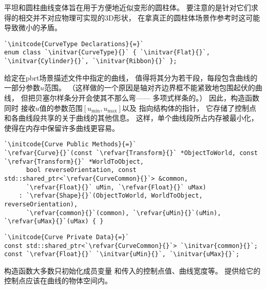 平坦和圆柱曲线变体旨在用于方便地近似变形的圆柱体。
要注意的是针对它们求得的相交并不对应物理可实现的3D形状，
在拿真正的圆柱体场景作参考时这可能导致微小的矛盾。
\begin{lstlisting}
`\initcode{CurveType Declarations}{=}`
enum class `\initvar{CurveType}{}` { `\initvar{Flat}{}`, `\initvar{Cylinder}{}`, `\initvar{Ribbon}{}` };
\end{lstlisting}

给定在pbrt场景描述文件中指定的曲线，
值得将其分为若干段，每段包含曲线的一部分参数$u$范围。
（这样做的一个原因是轴对齐边界框不能紧致地包围起伏的曲线，
但把贝塞尔样条分开会使其不那么弯——
多项式样条的。）
因此，构造函数同时
接收$u$值的参数范围$[u_{\min},u_{\max}]$以及
指向结构体的指针，
它存储了控制点和各曲线段共享的关于曲线的其他信息。
这样，单个曲线段所占内存被最小化，
使得在内存中保留许多曲线更容易。
\begin{lstlisting}
`\initcode{Curve Public Methods}{=}`
`\refvar{Curve}{}`(const `\refvar{Transform}{}` *ObjectToWorld, const `\refvar{Transform}{}` *WorldToObject,
      bool reverseOrientation, const std::shared_ptr<`\refvar{CurveCommon}{}`> &common,
      `\refvar{Float}{}` uMin, `\refvar{Float}{}` uMax)
    : `\refvar{Shape}{}`(ObjectToWorld, WorldToObject, reverseOrientation),
      `\refvar{common}{}`(common), `\refvar{uMin}{}`(uMin), `\refvar{uMax}{}`(uMax) { }
\end{lstlisting}
\begin{lstlisting}
`\initcode{Curve Private Data}{=}`
const std::shared_ptr<`\refvar{CurveCommon}{}`> `\initvar{common}{}`;
const `\refvar{Float}{}` `\initvar{uMin}{}`, `\initvar{uMax}{}`; 
\end{lstlisting}

构造函数大多数只初始化成员变量
和传入的控制点值、曲线宽度等。
提供给它的控制点应该在曲线的物体空间内。

